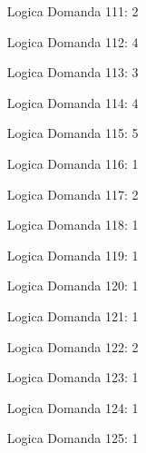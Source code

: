 \documentclass[20pt, a4paper]{article}
\begin{document}
\begin{itemize}[leftmargin=*]
\item [Logica] Domanda 111: 2
\item [Logica] Domanda 112: 4
\item [Logica] Domanda 113: 3
\item [Logica] Domanda 114: 4
\item [Logica] Domanda 115: 5
\item [Logica] Domanda 116: 1
\item [Logica] Domanda 117: 2
\item [Logica] Domanda 118: 1
\item [Logica] Domanda 119: 1
\item [Logica] Domanda 120: 1
\item [Logica] Domanda 121: 1
\item [Logica] Domanda 122: 2
\item [Logica] Domanda 123: 1
\item [Logica] Domanda 124: 1
\item [Logica] Domanda 125: 1
\end{itemize}
\end{document}
